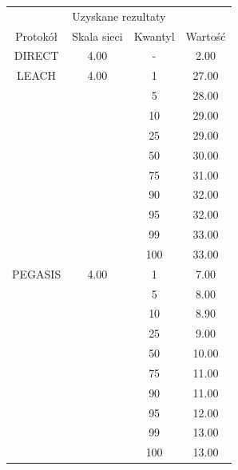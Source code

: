 \documentclass[a4paper,12pt,twoside,openany]{report}
\begin{document}
\begin{longtable}{*{4}{c}}
\toprule
\multicolumn{4}{c}{Uzyskane rezultaty} \\
Protokół	& Skala sieci	& Kwantyl	& Wartość \\
\midrule
\endhead
DIRECT	& 4.00 	& -	& 2.00 \\*
\midrule
LEACH	& 4.00	& 1	& 27.00 \\*
	&	& 5	& 28.00 \\*
	&	& 10	& 29.00 \\*
	&	& 25	& 29.00 \\*
	&	& 50	& 30.00 \\*
	&	& 75	& 31.00 \\*
	&	& 90	& 32.00 \\*
	&	& 95	& 32.00 \\*
	&	& 99	& 33.00 \\*
	&	& 100	& 33.00 \\*
\midrule
PEGASIS	& 4.00	& 1	& 7.00 \\*
	&	& 5	& 8.00 \\*
	&	& 10	& 8.90 \\*
	&	& 25	& 9.00 \\*
	&	& 50	& 10.00 \\*
	&	& 75	& 11.00 \\*
	&	& 90	& 11.00 \\*
	&	& 95	& 12.00 \\*
	&	& 99	& 13.00 \\*
	&	& 100	& 13.00 \\*
\bottomrule
\end{longtable}
\end{document}
